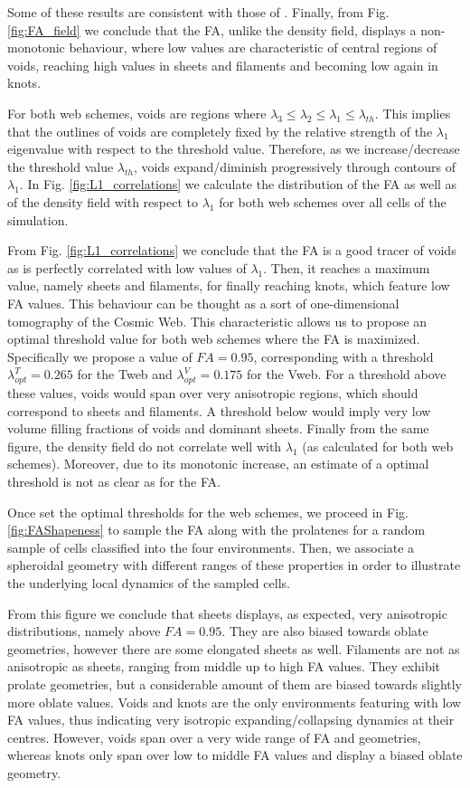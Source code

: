 \documentclass[a4,useAMS,usenatbib,usegraphicx]{latex/mn2e}
\begin{document}
Some of these results are consistent with those of \citet{Libeskind13}.
Finally, from Fig. \ref{fig:FA_field} we conclude that the FA, unlike the
density field, displays a non-monotonic behaviour, where low values are 
characteristic of central regions of voids, reaching high values in sheets
and filaments and becoming low again in knots. 


For both web schemes, voids are regions where $\lambda_3\leq\lambda_2\leq
\lambda_1\leq\lambda_{th}$. This implies that the outlines of voids
are completely fixed by the relative strength of the $\lambda_1$ 
eigenvalue with respect to the threshold value. Therefore, as we 
increase/decrease the threshold value $\lambda_{th}$, voids expand/diminish
progressively through contours of $\lambda_1$. In Fig. 
\ref{fig:L1_correlations} we calculate the distribution of the FA as well
as of the density field with respect to $\lambda_1$ for both web schemes 
over all cells of the simulation.


From Fig. \ref{fig:L1_correlations} we conclude that the FA is a good
tracer of voids as is perfectly correlated with low values of $\lambda_1$. 
Then, it reaches a maximum value, namely sheets and filaments, for finally
reaching knots, which feature low FA values. This behaviour can be thought 
as a sort of one-dimensional tomography of the Cosmic Web. This 
characteristic allows us to propose an optimal threshold value for both 
web schemes where the FA is maximized. Specifically we propose a value of 
$FA=0.95$, corresponding with a threshold $\lambda_{opt}^T = 0.265$ for
the Tweb and $\lambda_{opt}^V = 0.175$ for the Vweb.  For a threshold 
above these values, voids would span over very anisotropic regions, which 
should correspond to sheets and filaments. A threshold below would imply 
very low volume filling fractions of voids and dominant sheets. Finally 
from the same figure, the density field do not correlate well with 
$\lambda_1$ (as calculated for both web schemes). Moreover, due to its 
monotonic increase, an estimate of a optimal threshold is not as clear as 
for the FA.


Once set the optimal thresholds for the web schemes, we proceed in Fig. 
\ref{fig:FAShapeness} to sample the FA along with the prolatenes for a 
random sample of cells classified into the four environments. Then, we 
associate a spheroidal geometry with different ranges of these properties
in order to illustrate the underlying local dynamics of the sampled cells.


From this figure we conclude that sheets displays, as expected, very 
anisotropic distributions, namely above $FA=0.95$. They are also biased 
towards oblate geometries, however there are some elongated sheets as 
well. Filaments are not as anisotropic as sheets, ranging from middle up 
to high FA values. They exhibit prolate geometries, but a considerable 
amount of them are biased towards slightly more oblate values. Voids and 
knots are the only environments featuring with low FA values, thus 
indicating very isotropic expanding/collapsing dynamics at their centres. 
However, voids span over a very wide range of FA and geometries, whereas 
knots only span over low to middle FA values and display a biased oblate 
geometry.
\end{document}
